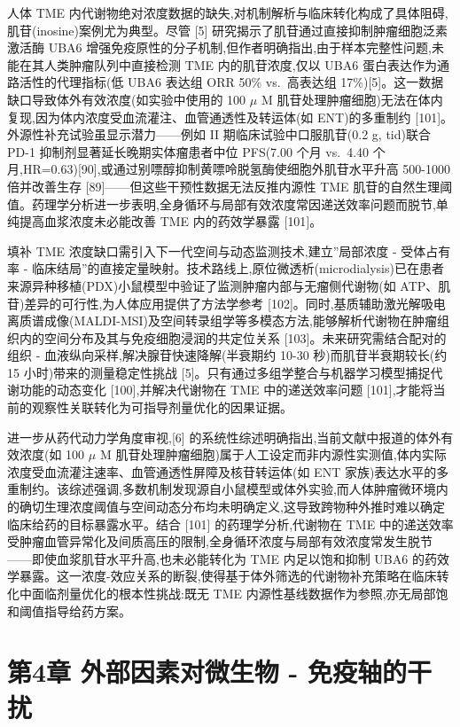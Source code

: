 人体 TME 内代谢物绝对浓度数据的缺失,对机制解析与临床转化构成了具体阻碍,肌苷(inosine)案例尤为典型。尽管 {[}5{]} 研究揭示了肌苷通过直接抑制肿瘤细胞泛素激活酶 UBA6 增强免疫原性的分子机制,但作者明确指出,由于样本完整性问题,未能在其人类肿瘤队列中直接检测 TME 内的肌苷浓度,仅以 UBA6 蛋白表达作为通路活性的代理指标(低 UBA6 表达组 ORR 50\% vs.~高表达组 17\%){[}5{]}。这一数据缺口导致体外有效浓度(如实验中使用的 100 \(\mu\) M 肌苷处理肿瘤细胞)无法在体内复现,因为体内浓度受血流灌注、血管通透性及转运体(如 ENT)的多重制约 {[}101{]}。外源性补充试验虽显示潜力------例如 II 期临床试验中口服肌苷(0.2 g, tid)联合 PD-1 抑制剂显著延长晚期实体瘤患者中位 PFS(7.00 个月 vs.~4.40 个月,HR=0.63){[}90{]},或通过别嘌醇抑制黄嘌呤脱氢酶使细胞外肌苷水平升高 500-1000 倍并改善生存 {[}89{]}------但这些干预性数据无法反推内源性 TME 肌苷的自然生理阈值。药理学分析进一步表明,全身循环与局部有效浓度常因递送效率问题而脱节,单纯提高血浆浓度未必能改善 TME 内的药效学暴露 {[}101{]}。

填补 TME 浓度缺口需引入下一代空间与动态监测技术,建立''局部浓度 - 受体占有率 - 临床结局''的直接定量映射。技术路线上,原位微透析(microdialysis)已在患者来源异种移植(PDX)小鼠模型中验证了监测肿瘤内部与无瘤侧代谢物(如 ATP、肌苷)差异的可行性,为人体应用提供了方法学参考 {[}102{]}。同时,基质辅助激光解吸电离质谱成像(MALDI-MSI)及空间转录组学等多模态方法,能够解析代谢物在肿瘤组织内的空间分布及其与免疫细胞浸润的共定位关系 {[}103{]}。未来研究需结合配对的组织 - 血液纵向采样,解决腺苷快速降解(半衰期约 10-30 秒)而肌苷半衰期较长(约 15 小时)带来的测量稳定性挑战 {[}5{]}。只有通过多组学整合与机器学习模型捕捉代谢功能的动态变化 {[}100{]},并解决代谢物在 TME 中的递送效率问题 {[}101{]},才能将当前的观察性关联转化为可指导剂量优化的因果证据。

进一步从药代动力学角度审视,{[}6{]} 的系统性综述明确指出,当前文献中报道的体外有效浓度(如 100 \(\mu\) M 肌苷处理肿瘤细胞)属于人工设定而非内源性实测值,体内实际浓度受血流灌注速率、血管通透性屏障及核苷转运体(如 ENT 家族)表达水平的多重制约。该综述强调,多数机制发现源自小鼠模型或体外实验,而人体肿瘤微环境内的确切生理浓度阈值与空间动态分布均未明确定义,这导致跨物种外推时难以确定临床给药的目标暴露水平。结合 {[}101{]} 的药理学分析,代谢物在 TME 中的递送效率受肿瘤血管异常化及间质高压的限制,全身循环浓度与局部有效浓度常发生脱节------即使血浆肌苷水平升高,也未必能转化为 TME 内足以饱和抑制 UBA6 的药效学暴露。这一浓度-效应关系的断裂,使得基于体外筛选的代谢物补充策略在临床转化中面临剂量优化的根本性挑战:既无 TME 内源性基线数据作为参照,亦无局部饱和阈值指导给药方案。

\section{第4章 外部因素对微生物 - 免疫轴的干扰}\label{ux7b2c4ux7ae0-ux5916ux90e8ux56e0ux7d20ux5bf9ux5faeux751fux7269---ux514dux75abux8f74ux7684ux5e72ux6270}


